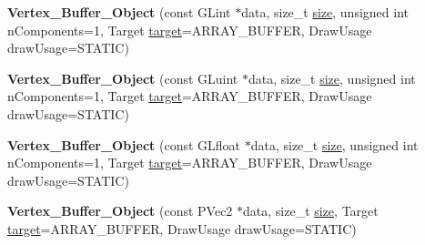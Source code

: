 \begin{DoxyCompactItemize}
\item 
\mbox{\label{classprz_1_1_vertex___buffer___object_a2e574c83ecbfbf4f92ed9053f5b8410e}} 
{\bfseries Vertex\+\_\+\+Buffer\+\_\+\+Object} (const G\+Lint $\ast$data, size\+\_\+t \mbox{\hyperlink{classprz_1_1_vertex___buffer___object_acc2dd595347b27c190d9542b4b624324}{size}}, unsigned int n\+Components=1, Target \mbox{\hyperlink{classprz_1_1_vertex___buffer___object_a093cc0098b6993768ebbc9a2c3efeced}{target}}=A\+R\+R\+A\+Y\+\_\+\+B\+U\+F\+F\+ER, Draw\+Usage draw\+Usage=S\+T\+A\+T\+IC)
\item 
\mbox{\label{classprz_1_1_vertex___buffer___object_acaeca719dc93bd6994f9a1fc817ddb4d}} 
{\bfseries Vertex\+\_\+\+Buffer\+\_\+\+Object} (const G\+Luint $\ast$data, size\+\_\+t \mbox{\hyperlink{classprz_1_1_vertex___buffer___object_acc2dd595347b27c190d9542b4b624324}{size}}, unsigned int n\+Components=1, Target \mbox{\hyperlink{classprz_1_1_vertex___buffer___object_a093cc0098b6993768ebbc9a2c3efeced}{target}}=A\+R\+R\+A\+Y\+\_\+\+B\+U\+F\+F\+ER, Draw\+Usage draw\+Usage=S\+T\+A\+T\+IC)
\item 
\mbox{\label{classprz_1_1_vertex___buffer___object_a412d7b4200dd58179f30f61eecaab891}} 
{\bfseries Vertex\+\_\+\+Buffer\+\_\+\+Object} (const G\+Lfloat $\ast$data, size\+\_\+t \mbox{\hyperlink{classprz_1_1_vertex___buffer___object_acc2dd595347b27c190d9542b4b624324}{size}}, unsigned int n\+Components=1, Target \mbox{\hyperlink{classprz_1_1_vertex___buffer___object_a093cc0098b6993768ebbc9a2c3efeced}{target}}=A\+R\+R\+A\+Y\+\_\+\+B\+U\+F\+F\+ER, Draw\+Usage draw\+Usage=S\+T\+A\+T\+IC)
\item 
\mbox{\label{classprz_1_1_vertex___buffer___object_a9edd86c88f70d2d427f7aacf5fad23ff}} 
{\bfseries Vertex\+\_\+\+Buffer\+\_\+\+Object} (const P\+Vec2 $\ast$data, size\+\_\+t \mbox{\hyperlink{classprz_1_1_vertex___buffer___object_acc2dd595347b27c190d9542b4b624324}{size}}, Target \mbox{\hyperlink{classprz_1_1_vertex___buffer___object_a093cc0098b6993768ebbc9a2c3efeced}{target}}=A\+R\+R\+A\+Y\+\_\+\+B\+U\+F\+F\+ER, Draw\+Usage draw\+Usage=S\+T\+A\+T\+IC)
\item 
\mbox{\label{classprz_1_1_vertex___buffer___object_ac186acadbd2290883959e5b7ef291e00}} 

\end{DoxyCompactItemize}
